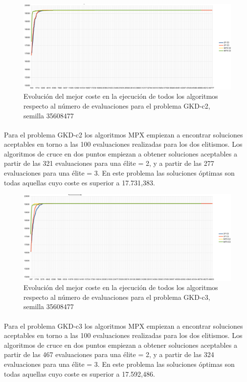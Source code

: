 	\begin{figure}[H]
		\centering
		\includegraphics[scale=0.3]{img/35608477_GKD-c_2_n500_m50.png}
		\caption{Evolución del mejor coste en la ejecución de todos los algoritmos respecto al número de evaluaciones para el problema GKD-c2, semilla 35608477}
		\label{gkd-c2_historico}
	\end{figure}

	\paragraph{}Para el problema GKD-c2 los algoritmos MPX empiezan a encontrar soluciones aceptables en torno a las 100 evaluaciones realizadas para los dos elitismos. Los algoritmos de cruce en dos puntos empiezan a obtener soluciones aceptables a partir de las 321 evaluaciones para una élite = 2, y a partir de las 277 evaluaciones para una élite = 3. En este problema las soluciones óptimas son todas aquellas cuyo coste es superior a 17.731,383.

	\begin{figure}[H]
		\centering
		\includegraphics[scale=0.3]{img/35608477_GKD-c_3_n500_m50.png}
		\caption{Evolución del mejor coste en la ejecución de todos los algoritmos respecto al número de evaluaciones para el problema GKD-c3, semilla 35608477}
		\label{gkd-c3_historico}
	\end{figure}

	\paragraph{}Para el problema GKD-c3 los algoritmos MPX empiezan a encontrar soluciones aceptables en torno a las 100 evaluaciones realizadas para los dos elitismos. Los algoritmos de cruce en dos puntos empiezan a obtener soluciones aceptables a partir de las 467 evaluaciones para una élite = 2, y a partir de las 324 evaluaciones para una élite = 3. En este problema las soluciones óptimas son todas aquellas cuyo coste es superior a 17.592,486.

